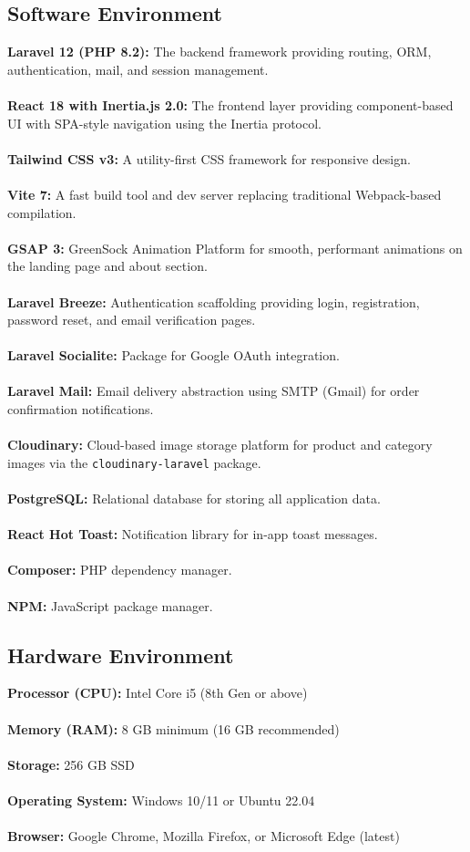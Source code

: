 \subsection{Software Environment}
\textbf{Laravel 12 (PHP 8.2):} The backend framework providing routing, ORM, authentication, mail, and session management.\\\\
\textbf{React 18 with Inertia.js 2.0:} The frontend layer providing component-based UI with SPA-style navigation using the Inertia protocol.\\\\
\textbf{Tailwind CSS v3:} A utility-first CSS framework for responsive design.\\\\
\textbf{Vite 7:} A fast build tool and dev server replacing traditional Webpack-based compilation.\\\\
\textbf{GSAP 3:} GreenSock Animation Platform for smooth, performant animations on the landing page and about section.\\\\
\textbf{Laravel Breeze:} Authentication scaffolding providing login, registration, password reset, and email verification pages.\\\\
\textbf{Laravel Socialite:} Package for Google OAuth integration.\\\\
\textbf{Laravel Mail:} Email delivery abstraction using SMTP (Gmail) for order confirmation notifications.\\\\
\textbf{Cloudinary:} Cloud-based image storage platform for product and category images via the \texttt{cloudinary-laravel} package.\\\\
\textbf{PostgreSQL:} Relational database for storing all application data.\\\\
\textbf{React Hot Toast:} Notification library for in-app toast messages.\\\\
\textbf{Composer:} PHP dependency manager.\\\\
\textbf{NPM:} JavaScript package manager.

\subsection{Hardware Environment}
\textbf{Processor (CPU):} Intel Core i5 (8th Gen or above)\\\\
\textbf{Memory (RAM):} 8 GB minimum (16 GB recommended)\\\\
\textbf{Storage:} 256 GB SSD\\\\
\textbf{Operating System:} Windows 10/11 or Ubuntu 22.04\\\\
\textbf{Browser:} Google Chrome, Mozilla Firefox, or Microsoft Edge (latest)


